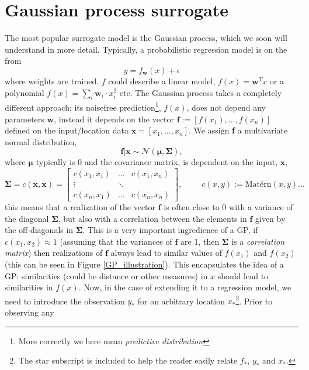 \section{Gaussian process surrogate}

The most popular surrogate model is the Gaussian process, which we soon will understand
in more detail. Typically, a probabilistic regression model is on the from 
$$y = f_{\textbf{w}}(x) + \epsilon$$
where weights are trained. $f$ could describe a linear model, $f(x) = \textbf{w}^Tx$ or a polynomial
$f(x) = \sum_i\textbf{w}_i\cdot x_i^2$ etc. %
The Gaussian process takes a completely different approach; its noisefree prediction\footnote{More
correctly we here mean \textit{predictive distribution}}, $f(x)$, does not depend any parameters
$\textbf{w}$, instead it depends on the vector $\textbf{f} := [f(x_1),\dots,f(x_n)]$ defined on the
input/location data $\textbf{x} = [x_1, \dots, x_n]$. We assign \textbf{f} a multivariate normal distribution, 
$$\textbf{f}|\textbf{x} \sim \mathcal{N}(\bm{\mu}, \bm{\Sigma}),$$
where $\bm{\mu}$ typically is $0$ and the covariance matrix, is dependent on the input, $\textbf{x}$, 
 $$\bm{\Sigma} = c(\textbf{x}, \textbf{x}) = \begin{bmatrix}
    c(x_1,x_1) & \dots & c(x_1,x_n)\\
    \vdots& \ddots\\
    c(x_n,x_1) & \dots & c(x_n,x_n) \end{bmatrix},\hspace{1cm} c(x, y) := \text{Matérn}(x,y)...$$ this
    means that a realization of the vector $\textbf{f}$ is often close to 0 with a variance of the
    diagonal $\bm{\Sigma}$, but also with a correlation between the elements in $\textbf{f}$ given
    by the off-diagonals in $\bm{\Sigma}$. This is a very important ingredience of a GP, if
    $c(x_1,x_2) \approx 1$ (assuming that the variances of $\textbf{f}$ are 1, then $\bm{\Sigma}$ is
    a \textit{correlation matrix}) then realizations of $\textbf{f}$ always lead to similar values
    of $f(x_1)$ and $f(x_2)$ (this can be seen in Figure \ref{GP_illustration}). This encapsulates
    the idea of a GP: similarities (could be distance or other measures) in $x$ should lead to
    similarities in $f(x)$. Now, in the case of extending it to a regression model, we need to
    introduce the observation $y_*$ for an arbitrary location $x_*$\footnote{The star subscript is
    included to help the reader easily relate $f_*$, $y_*$ and $x_*$.}. Prior to observing any
